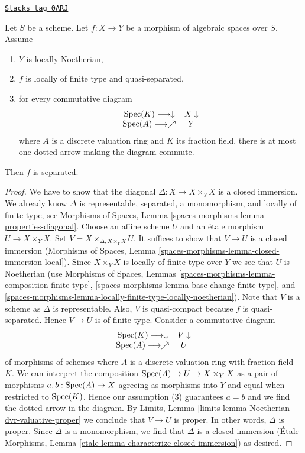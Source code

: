 \begin{lemma}
\label{spaces-cohomology-lemma-check-separated-dvr}
\href{https://stacks.math.columbia.edu/tag/0ARJ}{\texttt{Stacks tag 0ARJ}}

Let $S$ be a scheme. Let $f : X \to Y$ be a morphism of algebraic
spaces over $S$. Assume
\begin{enumerate}
\item $Y$ is locally Noetherian,
\item $f$ is locally of finite type and quasi-separated,
\item for every commutative diagram
$$
\begin{array}{cc}\operatorname{Spec}(K) \longrightarrow\downarrow & X \downarrow \\ \operatorname{Spec}(A) \longrightarrow\nearrow & Y\end{array}
$$
where $A$ is a discrete valuation ring and $K$ its fraction field,
there is at most one dotted arrow making the diagram commute.
\end{enumerate}
Then $f$ is separated.
\end{lemma}

\begin{proof}
We have to show that the diagonal $\Delta : X \to X \times_Y X$ is a closed
immersion. We already know $\Delta$ is representable, separated,
a monomorphism, and locally of finite type, see Morphisms of Spaces, Lemma
\ref{spaces-morphisms-lemma-properties-diagonal}.
Choose an affine scheme $U$ and an \'etale morphism
$U \to X \times_Y X$. Set $V = X \times_{\Delta, X \times_Y X} U$.
It suffices to show that $V \to U$ is a closed immersion
(Morphisms of Spaces, Lemma
\ref{spaces-morphisms-lemma-closed-immersion-local}).
Since $X \times_Y X$ is locally of finite type over $Y$ we see that
$U$ is Noetherian (use Morphisms of Spaces, Lemmas
\ref{spaces-morphisms-lemma-composition-finite-type},
\ref{spaces-morphisms-lemma-base-change-finite-type}, and
\ref{spaces-morphisms-lemma-locally-finite-type-locally-noetherian}).
Note that $V$ is a scheme as $\Delta$ is representable.
Also, $V$ is quasi-compact because $f$ is quasi-separated.
Hence $V \to U$ is of finite type. Consider a commutative diagram
$$
\begin{array}{cc}\operatorname{Spec}(K) \longrightarrow\downarrow & V \downarrow \\ \operatorname{Spec}(A) \longrightarrow\nearrow & U\end{array}
$$
of morphisms of schemes
where $A$ is a discrete valuation ring with fraction field $K$.
We can interpret the composition $\operatorname{Spec}(A) \to U \to X \times_Y X$
as a pair of morphisms $a, b : \operatorname{Spec}(A) \to X$ agreeing as morphisms
into $Y$ and equal when restricted to $\operatorname{Spec}(K)$. Hence our assumption
(3) guarantees $a = b$ and we find the dotted arrow in the diagram.
By Limits, Lemma \ref{limits-lemma-Noetherian-dvr-valuative-proper}
we conclude that $V \to U$ is proper. In other words, $\Delta$ is proper.
Since $\Delta$ is a monomorphism, we find that $\Delta$ is a
closed immersion (\'Etale Morphisms, Lemma
\ref{etale-lemma-characterize-closed-immersion}) as desired.
\end{proof}

